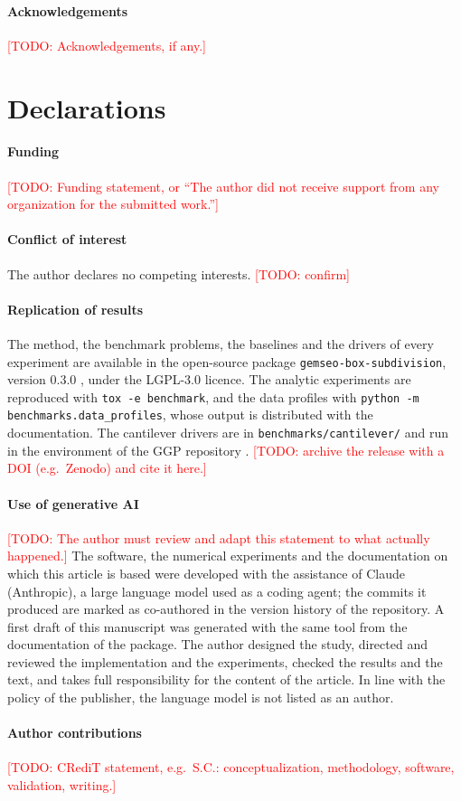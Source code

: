 \documentclass[pdflatex,sn-basic]{sn-jnl}
\providecommand{\backmatter}{}
\providecommand{\bmhead}[1]{\paragraph*{#1}}
\newcommand{\code}[1]{\texttt{\hyphenchar\font=45\relax #1}}
\newcommand{\todo}[1]{\textcolor{red}{[TODO: #1]}}
\begin{document}
\backmatter

\bmhead{Acknowledgements}
\todo{Acknowledgements, if any.}

\section*{Declarations}

\bmhead{Funding}
\todo{Funding statement, or ``The author did not receive support from any
organization for the submitted work.''}

\bmhead{Conflict of interest}
The author declares no competing interests. \todo{confirm}

\bmhead{Replication of results}
The method, the benchmark problems, the baselines and the drivers of every
experiment are available in the open-source package \code{gemseo-box-subdivision},
version 0.3.0 \citep{boxsubdivision}, under the LGPL-3.0 licence. The analytic
experiments are reproduced with \code{tox -e benchmark}, and the data profiles
with \code{python -m benchmarks.data\_profiles}, whose output is distributed with
the documentation. The cantilever drivers are in \code{benchmarks/cantilever/}
and run in the environment of the GGP repository \citep{ggpcode}.
\todo{archive the release with a DOI (e.g.\ Zenodo) and cite it here.}

\bmhead{Use of generative AI}
\todo{The author must review and adapt this statement to what actually happened.}
The software, the numerical experiments and the documentation on which this
article is based were developed with the assistance of Claude (Anthropic), a
large language model used as a coding agent; the commits it produced are marked
as co-authored in the version history of the repository. A first draft of this
manuscript was generated with the same tool from the documentation of the
package. The author designed the study, directed and reviewed the
implementation and the experiments, checked the results and the text, and takes
full responsibility for the content of the article. In line with the policy of
the publisher, the language model is not listed as an author.

\bmhead{Author contributions}
\todo{CRediT statement, e.g.\ S.C.: conceptualization, methodology, software,
validation, writing.}
\end{document}
